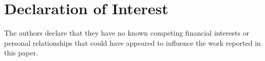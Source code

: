 
\section{Declaration of Interest}
The authors declare that they have no known competing financial interests or personal relationships that could have appeared to influence the work reported in this paper.